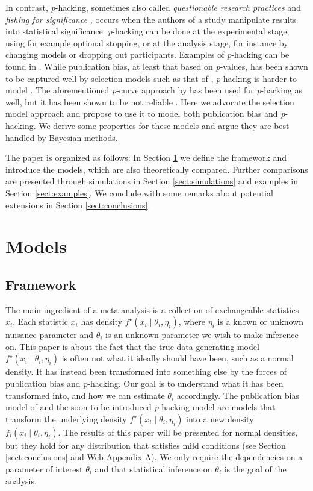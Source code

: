 \documentclass[useAMS,usenatbib,referee]{biom}
\begin{document}
In contrast, \textit{p}-hacking, sometimes also called \emph{questionable research practices} \citep{Sijtsma2016} and \emph{fishing for significance} \citep{Boulesteix2009}, occurs when the authors of a study manipulate results into statistical significance. \textit{p}-hacking can be done at the experimental stage, using for example optional stopping, or at the analysis stage, for instance by changing models or dropping out participants. Examples of \textit{p}-hacking can be found in \citet{simmons2011false}. While publication bias, at least that based on \textit{p}-values, has been shown to be captured well by selection models such as that of \citet{hedges1992modeling}, \textit{p}-hacking is harder to model \citep{carter2019correcting}. The aforementioned \textit{p}-curve approach by \citet{simonsohn2014p} has been used for \textit{p}-hacking as well, but it has been shown to be not reliable \citep{BrunsIoannidis2016}. Here we advocate the selection model approach and propose to use it to model both publication bias and \textit{p}-hacking. We derive some properties for these models and argue they are best handled by Bayesian methods. 

The paper is organized as follows: In Section \ref{sect:models} we define the framework and introduce the models, which are also theoretically compared. Further comparisons are presented through simulations in Section \ref{sect:simulations} and examples in Section \ref{sect:examples}. We conclude with some remarks about potential extensions in Section \ref{sect:conclusions}.

\section{Models}\label{sect:models}

\subsection{Framework}
The main ingredient of a meta-analysis is a collection of exchangeable statistics $x_{i}$. Each statistic $x_{i}$ has density $f^{\star}(x_{i}\mid\theta_{i},\eta_{i})$, where $\eta_i$ is a known or unknown nuisance parameter and $\theta_{i}$ is an unknown parameter we wish to make inference on. This paper is about the fact that the true data-generating model $f^{\star}(x_{i}\mid\theta_{i},\eta_{i})$ is often not what it ideally should have been, such as a normal density. It has instead been transformed into something else by the forces of publication bias and \textit{p}-hacking. Our goal is to understand what it has been transformed into, and how we can estimate $\theta_{i}$ accordingly. The publication bias model of \citet{hedges1992modeling,iyengar1988selection} and the soon-to-be introduced \textit{p}-hacking model are models that transform the underlying density $f^{\star}(x_{i}\mid\theta_{i},\eta_{i})$ into a new density $f_{i}(x_{i}\mid\theta_{i},\eta_{i})$. The results of this paper will be presented for normal densities, but they hold for any distribution that satisfies mild conditions (see Section \ref{sect:conclusions} and Web Appendix A). We only require the dependencies on a parameter of interest $\theta_{i}$ and that statistical inference on $\theta_{i}$ is the goal of the analysis.
\end{document}

